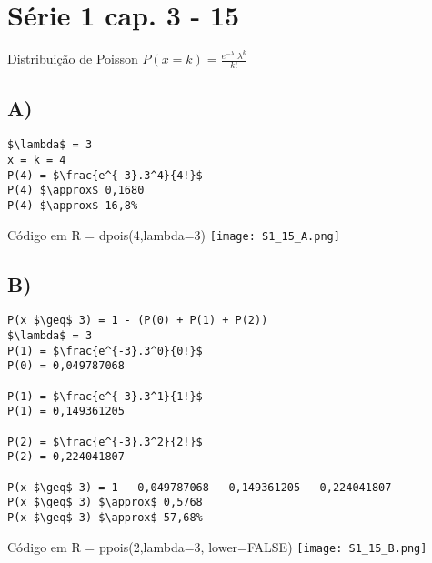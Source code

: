 \section*{Série 1 cap. 3 - 15}
Distribuição de Poisson $P(x = k) = \frac{e^{-\lambda}.\lambda^k}{k!}$
\subsection*{A)}
\begin{lstlisting}[mathescape]
$\lambda$ = 3
x = k = 4
P(4) = $\frac{e^{-3}.3^4}{4!}$
P(4) $\approx$ 0,1680
P(4) $\approx$ 16,8%
\end{lstlisting}
Código em R = dpois(4,lambda=3) \newline
\texttt{[image: S1\_15\_A.png]}


\subsection*{B)}
\begin{lstlisting}[mathescape]
P(x $\geq$ 3) = 1 - (P(0) + P(1) + P(2))
$\lambda$ = 3
P(1) = $\frac{e^{-3}.3^0}{0!}$
P(0) = 0,049787068

P(1) = $\frac{e^{-3}.3^1}{1!}$
P(1) = 0,149361205

P(2) = $\frac{e^{-3}.3^2}{2!}$
P(2) = 0,224041807

P(x $\geq$ 3) = 1 - 0,049787068 - 0,149361205 - 0,224041807
P(x $\geq$ 3) $\approx$ 0,5768
P(x $\geq$ 3) $\approx$ 57,68%
\end{lstlisting}
Código em R = ppois(2,lambda=3, lower=FALSE)\newline
\texttt{[image: S1\_15\_B.png]}